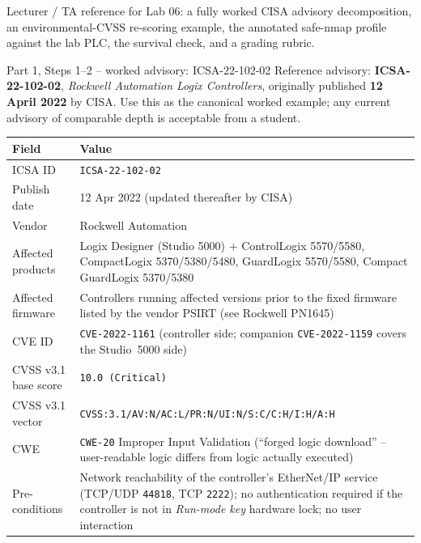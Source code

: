 \documentclass[11pt,a4paper]{article}
\begin{document}
\labheader

\begin{goalbox}
Lecturer / TA reference for Lab 06: a fully worked CISA advisory decomposition, an environmental-CVSS re-scoring example, the annotated safe-nmap profile against the lab PLC, the survival check, and a grading rubric.
\end{goalbox}

\begin{solutionbox}{Part 1, Steps 1--2 -- worked advisory: ICSA-22-102-02}
Reference advisory: \textbf{ICSA-22-102-02}, \emph{Rockwell Automation Logix Controllers}, originally published \textbf{12 April 2022} by CISA. Use this as the canonical worked example; any current advisory of comparable depth is acceptable from a student.

\begin{center}\footnotesize
\begin{tabular}{@{}p{3.6cm}p{11.0cm}@{}}
\toprule
\textbf{Field} & \textbf{Value} \\
\midrule
ICSA ID                 & \texttt{ICSA-22-102-02} \\
Publish date            & 12 Apr 2022 (updated thereafter by CISA) \\
Vendor                  & Rockwell Automation \\
Affected products       & Logix Designer (Studio 5000) + ControlLogix 5570/5580, CompactLogix 5370/5380/5480, GuardLogix 5570/5580, Compact GuardLogix 5370/5380 \\
Affected firmware       & Controllers running affected versions prior to the fixed firmware listed by the vendor PSIRT (see Rockwell PN1645) \\
CVE ID                  & \texttt{CVE-2022-1161} (controller side; companion \texttt{CVE-2022-1159} covers the Studio~5000 side) \\
CVSS v3.1 base score    & \texttt{10.0 (Critical)} \\
CVSS v3.1 vector        & \texttt{CVSS:3.1/AV:N/AC:L/PR:N/UI:N/S:C/C:H/I:H/A:H} \\
CWE                     & \texttt{CWE-20} Improper Input Validation (``forged logic download'' -- user-readable logic differs from logic actually executed) \\
Pre-conditions          & Network reachability of the controller's EtherNet/IP service (TCP/UDP \texttt{44818}, TCP \texttt{2222}); no authentication required if the controller is not in \emph{Run-mode key} hardware lock; no user interaction \\

\end{tabular}
\end{center}
\end{solutionbox}
\end{document}

